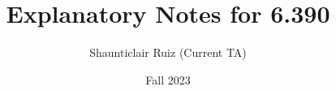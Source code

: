 \documentclass[10pt,oneside]{book}
\title{Explanatory Notes for 6.390}
\author{Shaunticlair Ruiz (Current TA)}
\date{Fall 2023}
\begin{document}
\maketitle

\setcounter{tocdepth}{2} %
\tableofcontents

 
 
 
 


 
 
 


 
 
 


 

 







 
% 

 
 
 


 


 \begin{appendices}
    
 \end{appendices} 



%
%










% 
% 
%





\end{document}
